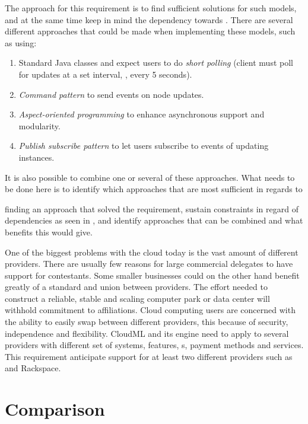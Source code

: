The approach for this requirement is to find sufficient solutions for such models,
and at the same time keep in mind the dependency towards .
There are several different approaches that could be made when implementing 
these models, such as using:
\begin{enumerate}
  \item Standard Java classes and expect users to do \emph{short polling} (client 
  must poll for updates at a set interval, \eg, every 5 seconds).
  \item \emph{Command pattern} to send events on node updates.
  \item \emph{Aspect-oriented programming} to enhance asynchronous support and modularity.
  \item \emph{Publish subscribe pattern} to let users subscribe to events of updating instances.
\end{enumerate}
It is also possible to combine one or several of these approaches.
What needs to be done here is to identify which approaches that are most sufficient 
in regards to 
\begin{ii} 
  \iitem finding an approach that solved the requirement,
  \iitem sustain constraints in regard of dependencies as seen in , and
  \iitem identify approaches that can be combined and what benefits this would give.
\end{ii} 

One of the biggest problems with the cloud today is the vast amount of different providers. 
There are usually few reasons for large commercial delegates to have support for contestants. 
Some smaller businesses could on the other hand benefit greatly of a standard and union 
between providers.
The effort needed to construct a reliable, stable and scaling computer park or data center will 
withhold commitment to affiliations. 
Cloud computing users are concerned with the ability to easily swap between different providers, 
this because of security, 
independence and flexibility. 
CloudML and its engine need to apply to several providers with different set of systems, 
features, s, payment methods and services. 
This requirement anticipate support for at least two different providers such as  and Rackspace.

\section{Comparison}


